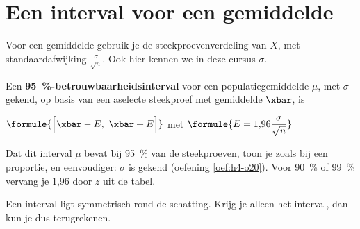 \begin{oefeningen}
\end{oefeningen}

\section{Een interval voor een gemiddelde}

Voor een gemiddelde gebruik je de steekproevenverdeling van $\overline{X}$, met standaardafwijking $\frac{\sigma}{\sqrt n}$. Ook hier kennen we in deze cursus $\sigma$.

\begin{theorie}
Een \textbf{\textcolor{accent}{95~\%-betrouwbaarheidsinterval}} voor een populatiegemiddelde $\mu$, met $\sigma$ gekend, op basis van een aselecte steekproef met gemiddelde $\xbar$, is

\vspace{1mm}
\qquad $\formule{\Bigl[\xbar - E,\ \xbar + E\Bigr]}$ \quad met \quad $\formule{E = 1{,}96 \dfrac{\sigma}{\sqrt{n}}}$
\end{theorie}

Dat dit interval $\mu$ bevat bij 95~\% van de steekproeven, toon je zoals bij een proportie, en eenvoudiger: $\sigma$ is gekend (oefening \ref{oef:h4-o20}). Voor 90~\% of 99~\% vervang je 1,96 door $z$ uit de tabel.


\begin{oefeningen}
\end{oefeningen}

Een interval ligt symmetrisch rond de schatting. Krijg je alleen het interval, dan kun je dus terugrekenen.

